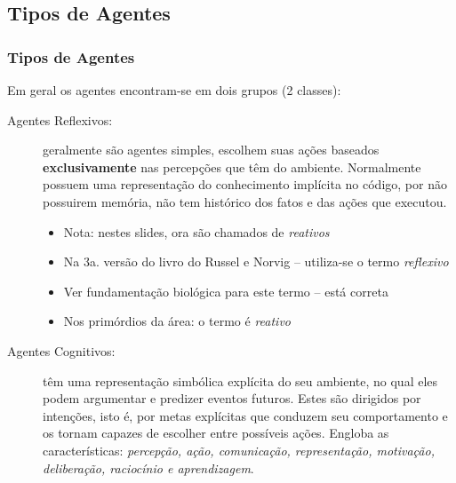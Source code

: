 \subsection{Tipos de Agentes}
\begin{frame} [allowframebreaks=0.9]
\frametitle{Tipos de Agentes}

Em geral os agentes encontram-se em  dois grupos (2 classes):

\begin{description}

 \item[Agentes Reflexivos:] geralmente são agentes simples, escolhem suas 
 ações baseados \textbf{exclusivamente} nas percepções que têm do ambiente. 
 Normalmente possuem uma representação do conhecimento implícita  no código, por não  possuirem  memória, não tem histórico dos fatos  e das ações que executou.
 
 \begin{itemize}
   \item Nota: nestes slides, ora são chamados de  \textit{reativos}
   
   \item Na 3a. versão do livro do Russel e Norvig -- utiliza-se o termo \textit{reflexivo}
   
   \item Ver fundamentação biológica para este termo -- está correta
   
   \item Nos primórdios da área: o termo é \textit{reativo} 
   
 \end{itemize}

 
\newpage

  \item[Agentes Cognitivos:]  têm uma representação simbólica explícita do seu ambiente, no qual eles podem argumentar e predizer eventos futuros. Estes são dirigidos por intenções, isto é, por metas explícitas que conduzem seu comportamento e os tornam capazes de escolher entre possíveis ações. 
  Engloba as características: \textit{percepção, ação, comunicação,  representação, 
  motivação, deliberação, raciocínio e aprendizagem}. 

\end{description}

\end{frame}

